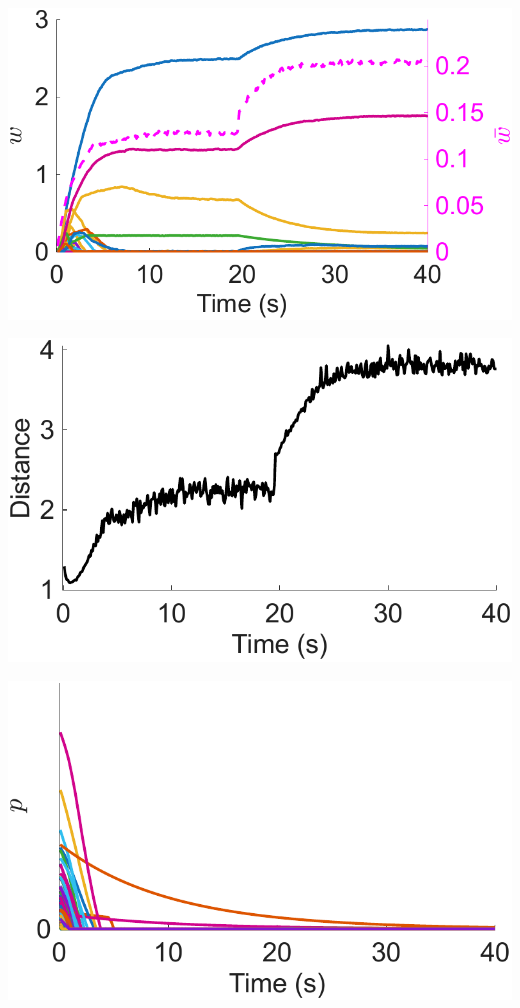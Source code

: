 \documentclass[utf8]{FrontiersinHarvard} %
\begin{document}
\begin{subfigure}
\begin{minipage}[b]{0.32\textwidth}
        \includegraphics[width=\linewidth]{rbSTDP/weights_E2E_traces}
        \caption{}
        \label{figs:results:weights_traces}
    \end{minipage}%
\setcounter{figure}{2}
\setcounter{subfigure}{6}
    \begin{minipage}[b]{0.32\textwidth}
        \includegraphics[width=\linewidth]{rbSTDP/weights_E2E_distance}
        \caption{}
        \label{figs:results:weights_distance}
    \end{minipage}%
\setcounter{figure}{2}
\setcounter{subfigure}{7}
    \begin{minipage}[b]{0.32\textwidth}
        \includegraphics[width=\linewidth]{rbSTDP/resource_pools}

\end{minipage}
\end{subfigure}
\end{document}
